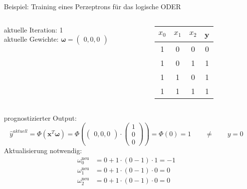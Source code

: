 \documentclass[11pt, aspectratio=169]{beamer}
\begin{document}
\begin{frame}{Beispiel: Training eines Perzeptrons für das logische ODER}
\begin{small}
\begin{columns}
\begin{column}{0.5\textwidth}
aktuelle Iteration:  1\\
aktuelle Gewichte: \alert{ $\boldsymbol{\omega} = \begin{pmatrix} 0, 0, 0 \end{pmatrix}$ }\\
\end{column}
\begin{column}{0.4\textwidth}  %
\begin{center} \begin{footnotesize}
\begin{tabular}{cccc} \toprule
$x_0$ & $x_1$ & $x_2$ & y \\ \midrule
1 & 0 & 0 & 0 \\
1 & 0 & 1 & 1 \\
1 & 1 & 0 & 1 \\
1 & 1 & 1 & 1 \\ \bottomrule
\end{tabular} \end{footnotesize}
\end{center}
\end{column}
\end{columns}
prognostizierter Output:
\[\hat{y}^{aktuell} = \Phi(\mathbf{x}^{T}\boldsymbol{\omega}) = \Phi\left( \begin{pmatrix} 0, 0, 0 \end{pmatrix}\cdot \begin{pmatrix} 1 \\ 0 \\ 0 \end{pmatrix} \right) = \Phi(0) = 1 \qquad \neq \qquad y = 0\]
Aktualisierung notwendig:
\begin{align*}
\omega_0^{\text{neu}} &= 0 + 1\cdot (0-1)\cdot 1 = -1\\
\omega_1^{\text{neu}} &= 0 + 1\cdot (0-1)\cdot 0 = 0\\
\omega_2^{\text{neu}} &= 0 + 1\cdot (0-1)\cdot 0 = 0
\end{align*}
\end{small}
\end{frame}
\end{document}
